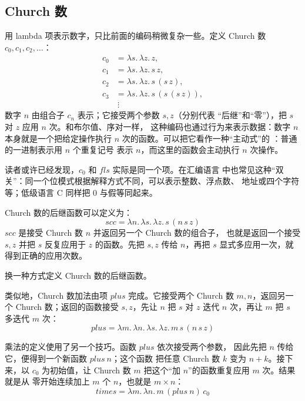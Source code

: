 \subsection*{Church 数}

用 lambda 项表示数字，只比前面的编码稍微复杂一些。定义 Church 数
\(c_0,c_1,c_2,\ldots\)：
\[
\begin{aligned}
 c_0&=\lambda s.\,\lambda z.\,z,\\
 c_1&=\lambda s.\,\lambda z.\,s\,z,\\
 c_2&=\lambda s.\,\lambda z.\,s\,(s\,z),\\
 c_3&=\lambda s.\,\lambda z.\,s\,(s\,(s\,z)),\\
 &\ \vdots
\end{aligned}
\]
数字 \(n\) 由组合子 \(c_n\) 表示；它接受两个参数 \(s,z\)（分别代表
“后继”和“零”），把 \(s\) 对 \(z\) 应用 \(n\) 次。和布尔值、序对一样，
这种编码也通过行为来表示数据：数字 \(n\) 本身就是一个把给定操作执行
\(n\) 次的函数。可以把它看作一种“主动式”的
：普通的一进制表示用 \(n\) 个重复记号
表示 \(n\)，而这里的函数会主动执行 \(n\) 次操作。

读者或许已经发现，\(c_0\) 和 \(\mathit{fls}\) 实际是同一个项。在汇编语言
中也常见这种“双关”：同一个位模式根据解释方式不同，可以表示整数、浮点数、
地址或四个字符等；低级语言 C 同样把 \(0\) 与假等同起来。

Church 数的后继函数可以定义为：
\[
 \mathit{scc}=\lambda n.\,\lambda s.\,\lambda z.\,s\,(n\,s\,z)
\]
\(\mathit{scc}\) 是接受 Church 数 \(n\) 并返回另一个 Church 数的组合子，
也就是返回一个接受 \(s,z\) 并把 \(s\) 反复应用于 \(z\) 的函数。先把
\(s,z\) 传给 \(n\)，再把 \(s\) 显式多应用一次，就得到正确的应用次数。

\begin{exercise}[\(\star\star\)]
\label{ex:5.2.2}
换一种方式定义 Church 数的后继函数。
\end{exercise}

类似地，Church 数加法由项 \(\mathit{plus}\) 完成。它接受两个 Church 数
\(m,n\)，返回另一个 Church 数；返回的函数接受 \(s,z\)，先让 \(n\)
把 \(s\) 对 \(z\) 迭代 \(n\) 次，再让 \(m\) 把 \(s\) 多迭代 \(m\) 次：
\[
 \mathit{plus}
 =\lambda m.\,\lambda n.\,\lambda s.\,\lambda z.\,m\,s\,(n\,s\,z)
\]

乘法的定义使用了另一个技巧。函数 \(\mathit{plus}\) 依次接受两个参数，
因此先把 \(n\) 传给它，便得到一个新函数 \(\mathit{plus}\ n\)；这个函数
把任意 Church 数 \(k\) 变为 \(n+k\)。接下来，以 \(c_0\) 为初始值，让
Church 数 \(m\) 把这个“加 \(n\)”的函数重复应用 \(m\) 次。结果就是从
零开始连续加上 \(m\) 个 \(n\)，也就是 \(m\times n\)：
\[
 \mathit{times}=\lambda m.\,\lambda n.\,m\,(\mathit{plus}\ n)\,c_0
\]

